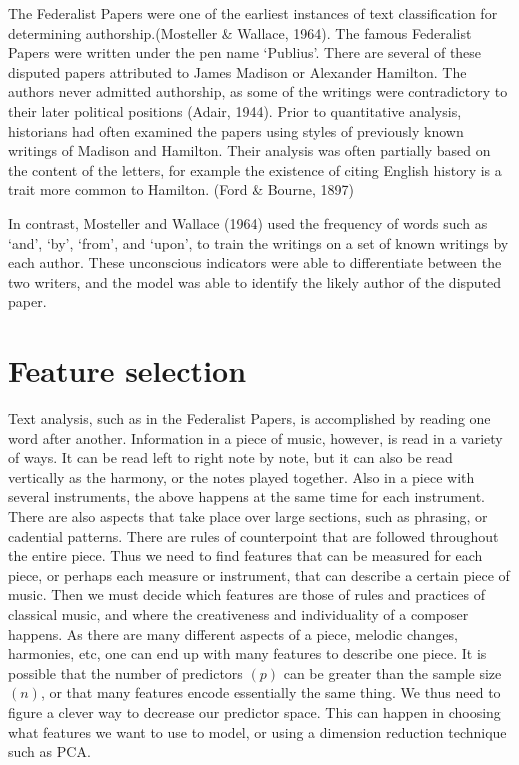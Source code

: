 \documentclass[12pt,twoside]{reedthesis}
\theoremstyle{definition}
\theoremstyle{definition}
\theoremstyle{definition}
\theoremstyle{remark}
\begin{document}
The Federalist Papers were one of the earliest instances of text
classification for determining authorship.(Mosteller \& Wallace, 1964).
The famous Federalist Papers were written under the pen name `Publius'.
There are several of these disputed papers attributed to James Madison
or Alexander Hamilton. The authors never admitted authorship, as some of
the writings were contradictory to their later political positions
(Adair, 1944). Prior to quantitative analysis, historians had often
examined the papers using styles of previously known writings of Madison
and Hamilton. Their analysis was often partially based on the content of
the letters, for example the existence of citing English history is a
trait more common to Hamilton. (Ford \& Bourne, 1897)

In contrast, Mosteller and Wallace (1964) used the frequency of words
such as `and', `by', `from', and `upon', to train the writings on a set
of known writings by each author. These unconscious indicators were able
to differentiate between the two writers, and the model was able to
identify the likely author of the disputed paper.

\section{Feature selection}\label{feature-selection}

Text analysis, such as in the Federalist Papers, is accomplished by
reading one word after another. Information in a piece of music,
however, is read in a variety of ways. It can be read left to right note
by note, but it can also be read vertically as the harmony, or the notes
played together. Also in a piece with several instruments, the above
happens at the same time for each instrument. There are also aspects
that take place over large sections, such as phrasing, or cadential
patterns. There are rules of counterpoint that are followed throughout
the entire piece. Thus we need to find features that can be measured for
each piece, or perhaps each measure or instrument, that can describe a
certain piece of music. Then we must decide which features are those of
rules and practices of classical music, and where the creativeness and
individuality of a composer happens. As there are many different aspects
of a piece, melodic changes, harmonies, etc, one can end up with many
features to describe one piece. It is possible that the number of
predictors \((p)\) can be greater than the sample size \((n)\), or that
many features encode essentially the same thing. We thus need to figure
a clever way to decrease our predictor space. This can happen in
choosing what features we want to use to model, or using a dimension
reduction technique such as PCA.
\end{document}

